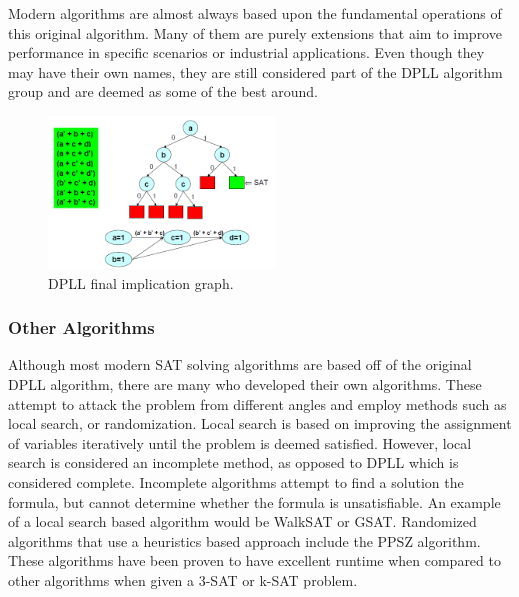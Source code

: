 \documentclass{article}
\begin{document}
    Modern algorithms are almost always based upon the fundamental operations of this original algorithm. Many of them are purely extensions
    that aim to improve performance in specific scenarios or industrial applications. Even though they may have their own names, they are
    still considered part of the DPLL algorithm group and are deemed as some of the best around.

    \begin{figure}[h]
        \caption{DPLL final implication graph. \cite{dpllgraph}}
        \includegraphics[width=6cm]{Dpll11.png}
        \centering
    \end{figure}

    \subsubsection{Other Algorithms}
    Although most modern SAT solving algorithms are based off of the original DPLL algorithm, there are many who developed their own
    algorithms. These attempt to attack the problem from different angles and employ methods such as local search, or randomization.
    Local search is based on improving the assignment of variables iteratively until the problem is deemed satisfied. However, local search
    is considered an incomplete method, as opposed to DPLL which is considered complete. Incomplete algorithms attempt to find a solution
    the formula, but cannot determine whether the formula is unsatisfiable. An example of a local search based algorithm would be WalkSAT or
    GSAT. Randomized algorithms that use a heuristics based approach include the PPSZ algorithm. These algorithms have been proven to have
    excellent runtime when compared to other algorithms when given a 3-SAT or k-SAT problem\cite{ppsz}.
\end{document}
